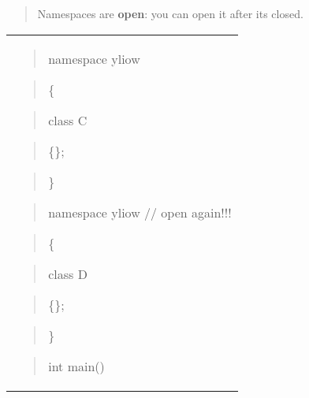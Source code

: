\documentclass[
]{article}
\begin{document}
\begin{quote}
Namespaces are \textbf{open}: you can open it after it\textquotesingle s
closed.
\end{quote}

\begin{quote}
\end{quote}

\begin{longtable}[]{@{}
  >{\raggedright\arraybackslash}p{}@{}}
\toprule\noalign{}
 \\
\midrule\noalign{}
\endhead
\bottomrule\noalign{}
\endlastfoot
\begin{quote}
namespace yliow
\end{quote}

\begin{quote}
\{
\end{quote}

\begin{quote}
class C
\end{quote}

\begin{quote}
\{\};
\end{quote}

\begin{quote}
\}
\end{quote}

\begin{quote}
\end{quote}

\begin{quote}
namespace yliow // open again!!!
\end{quote}

\begin{quote}
\{
\end{quote}

\begin{quote}
class D
\end{quote}

\begin{quote}
\{\};
\end{quote}

\begin{quote}
\}
\end{quote}

\begin{quote}
\end{quote}

\begin{quote}
int main()
\end{quote}


\end{longtable}
\end{document}
